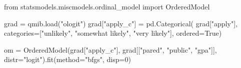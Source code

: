 \documentclass[
  letterpaper,
  10pt,
  twoside,
  openright,
  numbers=noenddot,
  chapterprefix=true]{scrbook}
\newenvironment{Shaded}{}{}
\newcommand{\DecValTok}[1]{\textcolor[rgb]{0.00,0.36,0.77}{#1}}
\newcommand{\ImportTok}[1]{\textcolor[rgb]{0.01,0.18,0.38}{#1}}
\newcommand{\NormalTok}[1]{\textcolor[rgb]{0.14,0.16,0.18}{#1}}
\newcommand{\OperatorTok}[1]{\textcolor[rgb]{0.14,0.16,0.18}{#1}}
\newcommand{\StringTok}[1]{\textcolor[rgb]{0.01,0.18,0.38}{#1}}
\newcommand{\VariableTok}[1]{\textcolor[rgb]{0.89,0.38,0.04}{#1}}
\begin{document}
\label{check-ordinal}
\begin{Shaded}
\begin{Highlighting}[]
\ImportTok{from}\NormalTok{ statsmodels.miscmodels.ordinal\_model }\ImportTok{import}\NormalTok{ OrderedModel}

\NormalTok{grad }\OperatorTok{=}\NormalTok{ qmib.load(}\StringTok{"ologit"}\NormalTok{)}
\NormalTok{grad[}\StringTok{"apply\_c"}\NormalTok{] }\OperatorTok{=}\NormalTok{ pd.Categorical(}
\NormalTok{    grad[}\StringTok{"apply"}\NormalTok{], categories}\OperatorTok{=}\NormalTok{[}\StringTok{"unlikely"}\NormalTok{, }\StringTok{"somewhat likely"}\NormalTok{, }\StringTok{"very likely"}\NormalTok{], ordered}\OperatorTok{=}\VariableTok{True}\NormalTok{)}

\NormalTok{om }\OperatorTok{=}\NormalTok{ OrderedModel(grad[}\StringTok{"apply\_c"}\NormalTok{], grad[[}\StringTok{"pared"}\NormalTok{, }\StringTok{"public"}\NormalTok{, }\StringTok{"gpa"}\NormalTok{]],}
\NormalTok{                  distr}\OperatorTok{=}\StringTok{"logit"}\NormalTok{).fit(method}\OperatorTok{=}\StringTok{"bfgs"}\NormalTok{, disp}\OperatorTok{=}\DecValTok{0}\NormalTok{)}


\end{Highlighting}
\end{Shaded}
\end{document}
